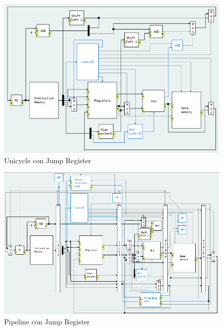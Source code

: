 \documentclass[11pt,a4paper, spanish]{article}
\begin{document}
\begin{figure}
\begin{center}
\includegraphics[width=\textwidth,height=\textheight,keepaspectratio]{img/unicycle_jr.png}
\caption{Unicycle con Jump Register}
\end{center}
\end{figure}

\begin{figure}
\begin{center}
\includegraphics[width=\textwidth,height=\textheight,keepaspectratio]{img/pipeline_jr.png}
\caption{Pipeline con Jump Register}
\end{center}
\end{figure}
\end{document}
